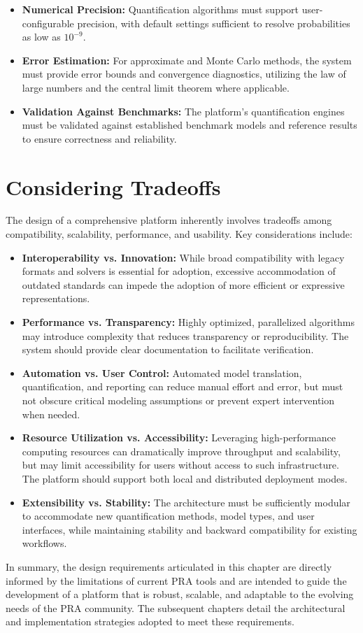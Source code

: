 \begin{itemize}
    \item \textbf{Numerical Precision:} Quantification algorithms must support user-configurable precision, with default settings sufficient to resolve probabilities as low as $10^{-9}$.
    \item \textbf{Error Estimation:} For approximate and Monte Carlo methods, the system must provide error bounds and convergence diagnostics, utilizing the law of large numbers and the central limit theorem where applicable.
    \item \textbf{Validation Against Benchmarks:} The platform's quantification engines must be validated against established benchmark models and reference results to ensure correctness and reliability.
\end{itemize}

\section{Considering Tradeoffs}
\label{sec:tradeoffs}

The design of a comprehensive platform inherently involves tradeoffs among compatibility, scalability, performance, and usability. Key considerations include:

\begin{itemize}
    \item \textbf{Interoperability vs. Innovation:} While broad compatibility with legacy formats and solvers is essential for adoption, excessive accommodation of outdated standards can impede the adoption of more efficient or expressive representations.
    \item \textbf{Performance vs. Transparency:} Highly optimized, parallelized algorithms may introduce complexity that reduces transparency or reproducibility. The system should provide clear documentation to facilitate verification.
    \item \textbf{Automation vs. User Control:} Automated model translation, quantification, and reporting can reduce manual effort and error, but must not obscure critical modeling assumptions or prevent expert intervention when needed.
    \item \textbf{Resource Utilization vs. Accessibility:} Leveraging high-performance computing resources can dramatically improve throughput and scalability, but may limit accessibility for users without access to such infrastructure. The platform should support both local and distributed deployment modes.
    \item \textbf{Extensibility vs. Stability:} The architecture must be sufficiently modular to accommodate new quantification methods, model types, and user interfaces, while maintaining stability and backward compatibility for existing workflows.
\end{itemize}

In summary, the design requirements articulated in this chapter are directly informed by the limitations of current PRA tools and are intended to guide the development of a platform that is robust, scalable, and adaptable to the evolving needs of the PRA community. The subsequent chapters detail the architectural and implementation strategies adopted to meet these requirements.